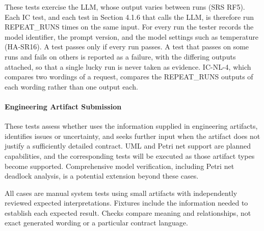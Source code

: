 \documentclass[12pt, titlepage]{article}
\begin{document}
These tests exercise the LLM, whose output varies between runs (SRS RF5). Each
IC test, and each test in Section 4.1.6 that calls the LLM, is therefore run
REPEAT\_RUNS times on the same input. For every run the tester records the
model identifier, the prompt version, and the model settings such as
temperature (HA-SR16). A test passes only if every run passes. A test that
passes on some runs and fails on others is reported as a failure, with the
differing outputs attached, so that a single lucky run is never taken as
evidence. IC-NL-4, which compares two wordings of a request, compares the
REPEAT\_RUNS outputs of each wording rather than one output each.

\paragraph{Engineering Artifact Submission}

These tests assess whether \progname{} uses the information supplied in
engineering artifacts, identifies issues or uncertainty, and seeks further
input when the artifact does not justify a sufficiently detailed contract.
UML and Petri net support are planned capabilities, and the corresponding
tests will be executed as those artifact types become supported. Comprehensive 
model verification, including Petri net deadlock analysis, is a potential 
extension beyond these cases.

All cases are manual system tests using small artifacts with independently
reviewed expected interpretations. Fixtures include the information needed
to establish each expected result. Checks compare meaning and relationships,
not exact generated wording or a particular contract language.
\end{document}
